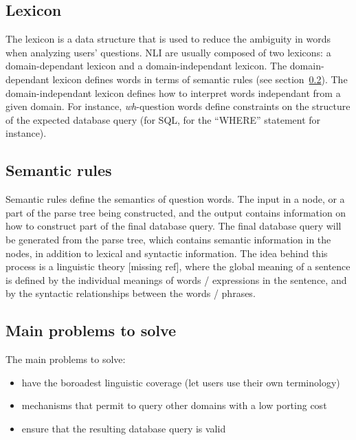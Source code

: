 \documentclass[10pt,journal,letterpaper,compsoc]{IEEEtran}
\begin{document}
\subsection{Lexicon}
The lexicon is a data structure that is used to reduce the ambiguity in words
when analyzing users' questions. 
NLI are usually composed of two lexicons: a domain-dependant lexicon and a
domain-independant lexicon. 
The domain-dependant lexicon defines words in terms of semantic rules (see
section~\ref{sec:anatomy-semantic-rules}).
The domain-independant lexicon defines how to interpret words independant from a
given domain. For instance, {\it wh}-question words define constraints on the
structure of the expected database query (for SQL, for the ``WHERE'' statement
for instance). 



\subsection{Semantic rules}
\label{sec:anatomy-semantic-rules}
Semantic rules define the semantics of question words. The input in a node, or a
part of the parse tree being constructed, and the output contains information on
how to construct part of the final database query. The final database query will
be generated from the parse tree, which contains semantic information in the
nodes, in addition to lexical and syntactic information. 
The idea behind this process is a linguistic theory [missing ref], where the
global meaning of a sentence is defined by the individual meanings of words /
expressions in the sentence, and by the syntactic relationships between the
words / phrases. 




\subsection{Main problems to solve}
The main problems to solve:
\begin{itemize}
  \item have the boroadest linguistic coverage (let users use their own
  terminology)
  \item mechanisms that permit to query other domains with a low porting cost
  \item ensure that the resulting database query is valid
\end{itemize}
\end{document}
